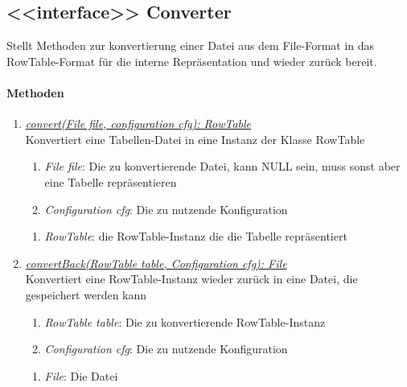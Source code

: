 \subsection{<{<{interface}>}> Converter}
Stellt Methoden zur konvertierung einer Datei aus dem File-Format in das RowTable-Format für die interne Repräsentation und wieder zurück bereit. \\

\paragraph{Methoden}
\begin{enumerate}[+]
	\item \underline{\textit{convert(File file, configuration cfg): RowTable}} \\
	Konvertiert eine Tabellen-Datei in eine Instanz der Klasse RowTable
	
	\begin{enumerate}[$\bullet$]
		\item \textit{File file}: Die zu konvertierende Datei, kann NULL sein, muss sonst aber eine Tabelle repräsentieren
		\item \textit{Configuration cfg}: Die zu nutzende Konfiguration
	\end{enumerate}
	\vspace{-0.2cm}
	\begin{enumerate}[$\circ$]
		\item \textit{RowTable}: die RowTable-Instanz die die Tabelle repräsentiert
	\end{enumerate}

	\item \underline{\textit{convertBack(RowTable table, Configuration cfg): File}} \\
	Konvertiert eine RowTable-Instanz wieder zurück in eine Datei, die gespeichert werden kann
	\begin{enumerate}[$\bullet$]
		\item \textit{RowTable table}: Die zu konvertierende RowTable-Instanz
		\item \textit{Configuration cfg}: Die zu nutzende Konfiguration
	\end{enumerate}
	\vspace{-0.2cm}
	\begin{enumerate}[$\circ$]
		\item \textit{File}: Die Datei
	\end{enumerate}
\end{enumerate}